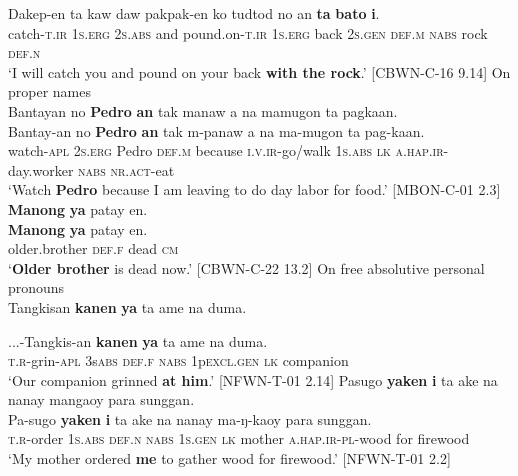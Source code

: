  \gll Dakep-en	ta kaw	daw	pakpak-en	ko	tudtod	no	an	\textbf{ta}	\textbf{bato}	\textbf{i}. \\
catch-\textsc{t.ir}	1\textsc{s.erg} 2\textsc{s.abs}	and	pound.on-\textsc{t.ir}	1\textsc{s.erg}	back	2\textsc{s.gen}	\textsc{def.m}	\textsc{nabs}	rock	\textsc{def.n} \\
\glt `I will catch you and pound on your back \textbf{with the rock}.’ [CBWN-C-16 9.14]
\z
\ea
On proper names \\
Bantayan	no	\textbf{Pedro}	\textbf{an}	tak	manaw	a	na	mamugon	ta	pagkaan. \\\smallskip
 \gll Bantay-an	no	\textbf{Pedro}	\textbf{an}	tak	m-panaw	a	na	ma-mugon	ta	pag-kaan. \\
watch-\textsc{apl}	2\textsc{s.erg}	Pedro	\textsc{def.m}	because	\textsc{i.v.ir}-go/walk	1\textsc{s.abs}	\textsc{lk} \textsc{a.hap.ir}-day.worker \textsc{nabs}	\textsc{nr.act}-eat \\
\glt ‘Watch \textbf{Pedro} because I am leaving to do day labor for food.’ [MBON-C-01 2.3]
\z
\ea
\textbf{Manong}	\textbf{ya}	patay	en. \\\smallskip
 \gll \textbf{Manong}	\textbf{ya}	patay	en. \\
older.brother	\textsc{def.f}	dead	\textsc{cm} \\
\glt ‘\textbf{Older brother} is dead now.’ [CBWN-C-22 13.2]
\z
\ea
On free absolutive personal pronouns \\
Tangkisan	\textbf{kanen}	\textbf{ya}	ta	ame	na	duma. \\\smallskip

\gll ...-Tangkis-an	\textbf{kanen}	\textbf{ya}	ta	ame	na	duma. \\
\textsc{t.r}-grin-\textsc{apl}	3s\textsc{abs}	\textsc{def.f}	\textsc{nabs}	1p\textsc{excl.gen}	\textsc{lk}	companion \\
\glt ‘Our companion grinned \textbf{at him}.’ [NFWN-T-01 2.14]
\z
\ea
Pasugo	\textbf{yaken}	\textbf{i}	ta	ake	na	nanay	mangaoy	para sunggan. \\\smallskip
 \gll Pa-sugo	\textbf{yaken}	\textbf{i}	ta	ake	na	nanay	ma-ŋ-kaoy	para sunggan. \\
\textsc{t.r}-order	1\textsc{s.abs}	\textsc{def.n}	\textsc{nabs}	1\textsc{s.gen}	\textsc{lk}	mother \textsc{a.hap.ir}-\textsc{pl}-wood	for firewood \\
\glt ‘My mother ordered \textbf{me} to gather wood for firewood.’ [NFWN-T-01 2.2]
\z 

